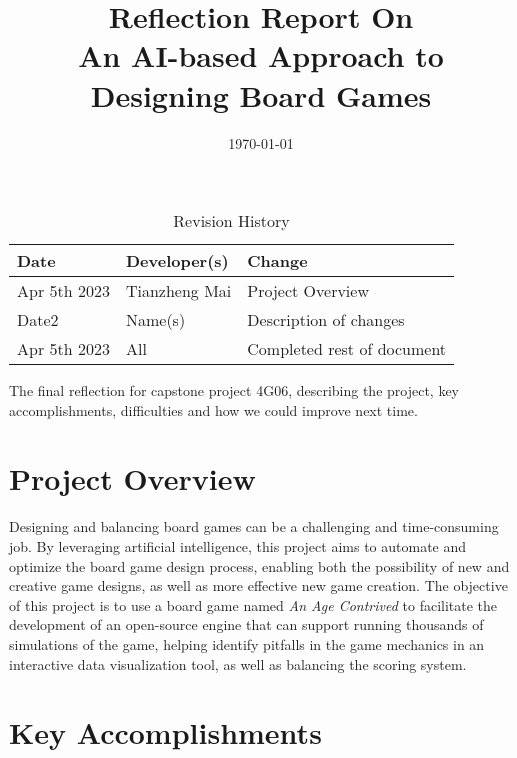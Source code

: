 \documentclass{article}
\title{Reflection Report On \\An AI-based Approach to Designing Board Games}
\author{\authname{}}
\date{\today}
\begin{document}
\begin{table}[hp]
\caption{Revision History} \label{TblRevisionHistory}
\begin{tabularx}{\textwidth}{llX}
\toprule
\textbf{Date} & \textbf{Developer(s)} & \textbf{Change}\\
\midrule
Apr 5th 2023 & Tianzheng Mai & Project Overview\\
Date2 & Name(s) & Description of changes\\
Apr 5th 2023 & All & Completed rest of document \\
\bottomrule
\end{tabularx}
\end{table}

\newpage

\maketitle

The final reflection for capstone project 4G06, describing the project, key accomplishments, difficulties and how we could improve next time.


\section{Project Overview}
Designing and balancing board games can be a challenging and time-consuming job. By leveraging artificial intelligence, this project aims to automate and optimize the board game design process, enabling both the possibility of new and creative game designs, as well as more effective new game creation. The objective of this project is to use a board game named \emph{An Age Contrived} to facilitate the development of an open-source engine that can support running thousands of simulations of the game, helping identify pitfalls in the game mechanics in an interactive data visualization tool, as well as balancing the scoring system. 


\section{Key Accomplishments}
\end{document}
